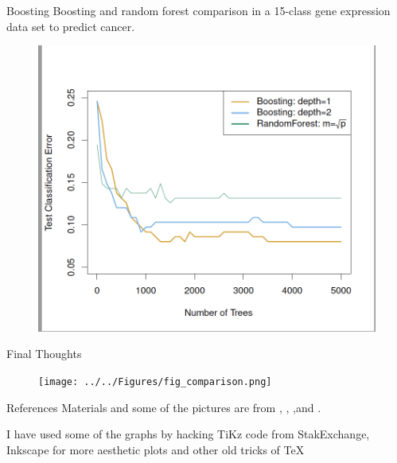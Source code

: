 \documentclass{beamer}
\begin{document}
\begin{frame}{Boosting}
	Boosting and random forest comparison in a 15-class gene expression data set to predict cancer.
	 \begin{figure}[h]
		\centering
		\includegraphics[scale=0.35]{../../Figures/fig_boosting.png}
	\end{figure}
	
\end{frame}

\begin{frame}{Final Thoughts}
	
 \begin{figure}[h]
	\centering
	\texttt{[image: ../../Figures/fig\_comparison.png]}
\end{figure}
\end{frame}

\begin{frame}{References}
	Materials and some of the pictures are from \citep{James2015}, \citep{genuer}, \citep{cartbook},and \citep{geron2}.
	\printbibliography 	
	
	I have used some of the graphs by hacking TiKz code from StakExchange, Inkscape for more aesthetic plots and other old tricks of \TeX
	
\end{frame}
\end{document}
